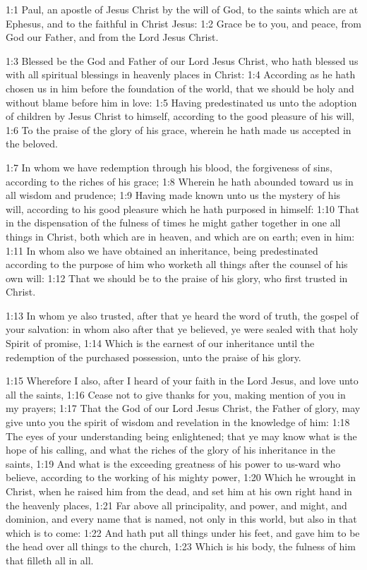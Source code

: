 

1:1 Paul, an apostle of Jesus Christ by the will of God, to the saints which are at Ephesus, and to the faithful in Christ Jesus: 1:2 Grace be to you, and peace, from God our Father, and from the Lord Jesus Christ.

1:3 Blessed be the God and Father of our Lord Jesus Christ, who hath blessed us with all spiritual blessings in heavenly places in Christ: 1:4 According as he hath chosen us in him before the foundation of the world, that we should be holy and without blame before him in love: 1:5 Having predestinated us unto the adoption of children by Jesus Christ to himself, according to the good pleasure of his will, 1:6 To the praise of the glory of his grace, wherein he hath made us accepted in the beloved.

1:7 In whom we have redemption through his blood, the forgiveness of sins, according to the riches of his grace; 1:8 Wherein he hath abounded toward us in all wisdom and prudence; 1:9 Having made known unto us the mystery of his will, according to his good pleasure which he hath purposed in himself: 1:10 That in the dispensation of the fulness of times he might gather together in one all things in Christ, both which are in heaven, and which are on earth; even in him: 1:11 In whom also we have obtained an inheritance, being predestinated according to the purpose of him who worketh all things after the counsel of his own will: 1:12 That we should be to the praise of his glory, who first trusted in Christ.

1:13 In whom ye also trusted, after that ye heard the word of truth, the gospel of your salvation: in whom also after that ye believed, ye were sealed with that holy Spirit of promise, 1:14 Which is the earnest of our inheritance until the redemption of the purchased possession, unto the praise of his glory.

1:15 Wherefore I also, after I heard of your faith in the Lord Jesus, and love unto all the saints, 1:16 Cease not to give thanks for you, making mention of you in my prayers; 1:17 That the God of our Lord Jesus Christ, the Father of glory, may give unto you the spirit of wisdom and revelation in the knowledge of him: 1:18 The eyes of your understanding being enlightened; that ye may know what is the hope of his calling, and what the riches of the glory of his inheritance in the saints, 1:19 And what is the exceeding greatness of his power to us-ward who believe, according to the working of his mighty power, 1:20 Which he wrought in Christ, when he raised him from the dead, and set him at his own right hand in the heavenly places, 1:21 Far above all principality, and power, and might, and dominion, and every name that is named, not only in this world, but also in that which is to come: 1:22 And hath put all things under his feet, and gave him to be the head over all things to the church, 1:23 Which is his body, the fulness of him that filleth all in all.


